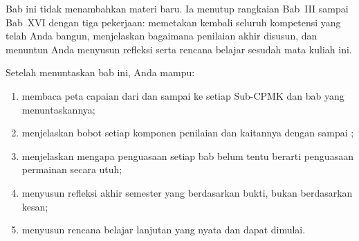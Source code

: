 \begin{tujuanbox}
Bab ini tidak menambahkan materi baru. Ia menutup rangkaian Bab~III sampai
Bab~XVI dengan tiga pekerjaan: memetakan kembali seluruh kompetensi yang telah
Anda bangun, menjelaskan bagaimana penilaian akhir disusun, dan menuntun Anda
menyusun refleksi serta rencana belajar sesudah mata kuliah ini.

Setelah menuntaskan bab ini, Anda mampu:
\begin{enumerate}
  \item membaca peta capaian dari  dan  sampai ke setiap
        Sub-CPMK dan bab yang menuntaskannya;
  \item menjelaskan bobot setiap komponen penilaian dan kaitannya dengan
         sampai ;
  \item menjelaskan mengapa penguasaan setiap bab belum tentu berarti
        penguasaan permainan secara utuh;
  \item menyusun refleksi akhir semester yang berdasarkan bukti, bukan
        berdasarkan kesan;
  \item menyusun rencana belajar lanjutan yang nyata dan dapat dimulai.
\end{enumerate}
\end{tujuanbox}
